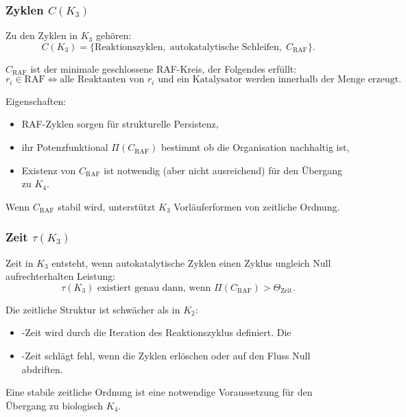 \subsubsection{Zyklen \texorpdfstring{$C(K_3)$}{C(K_3)}}

Zu den Zyklen in $K_3$ gehören:
\[
C(K_3) = \{\text{Reaktionszyklen},\;
           \text{autokatalytische Schleifen},\;
           C_{\mathrm{RAF}}\}.
\]

$C_{\mathrm{RAF}}$ ist der minimale geschlossene RAF-Kreis, der Folgendes erfüllt:
\[
r_i \in \text{RAF} \iff \text{alle Reaktanten von $r_i$ und ein Katalysator
werden innerhalb der Menge erzeugt.}
\]

Eigenschaften:
\begin{itemize}
    \item RAF-Zyklen sorgen für strukturelle Persistenz,
    \item ihr Potenzfunktional $\Pi(C_{\mathrm{RAF}})$ bestimmt
          ob die Organisation nachhaltig ist,
    \item Existenz von $C_{\mathrm{RAF}}$ ist notwendig (aber nicht
          ausreichend) für den Übergang zu $K_4$.
\end{itemize}

Wenn $C_{\mathrm{RAF}}$ stabil wird, unterstützt $K_3$ Vorläuferformen von
zeitliche Ordnung.

\subsubsection{Zeit \texorpdfstring{$\tau(K_3)$}{\tau(K_3)}}

Zeit in $K_3$ entsteht, wenn autokatalytische Zyklen einen Zyklus ungleich Null aufrechterhalten
Leistung:
\[
\tau(K_3) \text{ existiert genau dann, wenn } \Pi(C_{\mathrm{RAF}}) >
\Theta_{\mathrm{Zeit}}.
\]

Die zeitliche Struktur ist schwächer als in $K_2$:
\begin{itemize}
    Die \item-Zeit wird durch die Iteration des Reaktionszyklus definiert.
    Die \item-Zeit schlägt fehl, wenn die Zyklen erlöschen oder auf den Fluss Null abdriften.
\end{itemize}

Eine stabile zeitliche Ordnung ist eine notwendige Voraussetzung für den Übergang zu
biologisch $K_4$.


